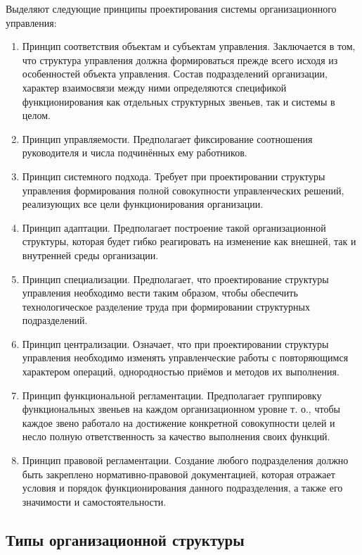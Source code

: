 \documentclass[12pt, russian, oneside, article]{ncc}
\begin{document}
Выделяют следующие принципы проектирования системы организационного управления:
\begin{enumerate}
\item Принцип соответствия объектам и субъектам управления. Заключается в том, что структура управления должна формироваться прежде всего исходя из особенностей объекта управления. Состав подразделений организации, характер взаимосвязи между ними определяются спецификой функционирования как отдельных структурных звеньев, так и системы в целом.
\item Принцип управляемости. Предполагает фиксирование соотношения руководителя и числа подчинённых ему работников.
\item Принцип системного подхода. Требует при проектировании структуры управления формирования полной совокупности управленческих решений, реализующих все цели функционирования организации.
\item Принцип адаптации. Предполагает построение такой организационной структуры, которая будет гибко реагировать на изменение как внешней, так и внутренней среды организации.
\item Принцип специализации. Предполагает, что проектирование структуры управления необходимо вести таким образом, чтобы обеспечить технологическое разделение труда при формировании структурных подразделений.
\item Принцип централизации. Означает, что при проектировании структуры управления необходимо изменять управленческие работы с повторяющимся характером операций, однородностью приёмов и методов их выполнения.
\item Принцип функциональной регламентации. Предполагает группировку функциональных звеньев на каждом организационном уровне т. о., чтобы каждое звено работало на достижение конкретной совокупности целей и несло полную ответственность за качество выполнения своих функций.
\item Принцип правовой регламентации. Создание любого подразделения должно быть закреплено нормативно-правовой документацией, которая отражает условия и порядок функционирования данного подразделения, а также его значимости и самостоятельности.
\end{enumerate}
\subsection{Типы организационной структуры}
\label{sec-5_3}
\end{document}
